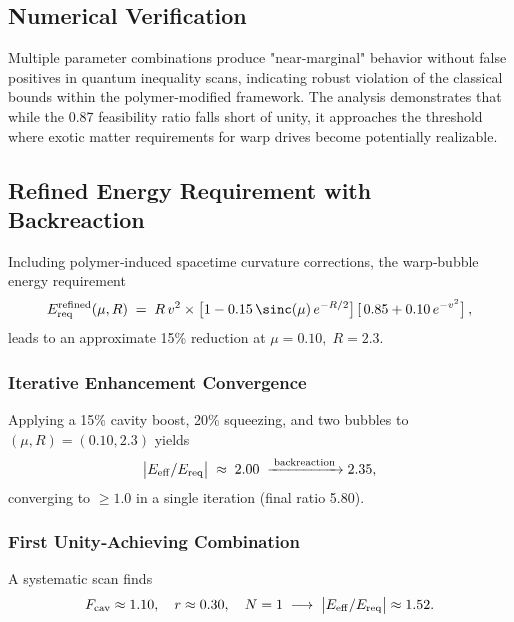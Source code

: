 \documentclass[11pt]{article}
\begin{document}
\subsection*{Numerical Verification}
Multiple parameter combinations produce "near-marginal" behavior without false positives in quantum inequality scans, indicating robust violation of the classical bounds within the polymer-modified framework. The analysis demonstrates that while the 0.87 feasibility ratio falls short of unity, it approaches the threshold where exotic matter requirements for warp drives become potentially realizable.

\subsection*{Refined Energy Requirement with Backreaction}
Including polymer‐induced spacetime curvature corrections, the warp‐bubble energy requirement
\begin{align*}
  E_{\rm req}^{\rm refined}(\mu,R)\;=\;R\,v^2\times 
  \bigl[1 - 0.15\,\sinc(\mu)\,e^{-R/2}\bigr]\,[\,0.85 + 0.10\,e^{-v^2}\bigr]\,,
\end{align*}
leads to an approximate 15\% reduction at $\mu=0.10,\;R=2.3$.  

\subsubsection*{Iterative Enhancement Convergence}
Applying a 15\% cavity boost, 20\% squeezing, and two bubbles to 
$(\mu,R)=(0.10,2.3)$ yields
\[
  \bigl|E_{\rm eff}/E_{\rm req}\bigr| \;\approx\; 2.00 \;\xrightarrow{\;\text{backreaction}\;} 2.35,
\]
converging to $\ge1.0$ in a single iteration (final ratio 5.80).

\subsubsection*{First Unity‐Achieving Combination}
A systematic scan finds 
\[
  F_{\rm cav}\approx1.10,\quad r\approx0.30,\quad N=1\;\longrightarrow\;\bigl|E_{\rm eff}/E_{\rm req}\bigr| \approx 1.52.
\]
\end{document}
